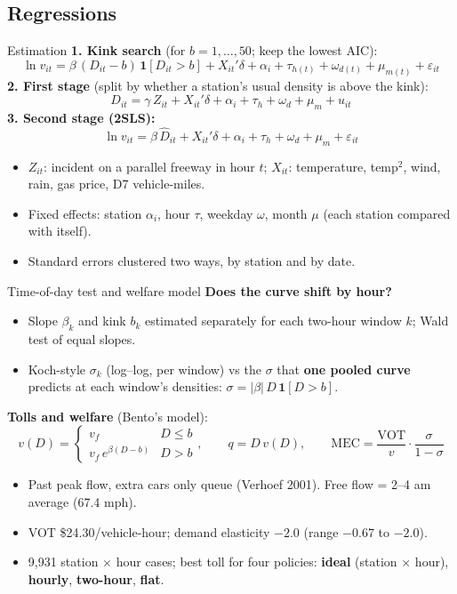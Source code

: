 \documentclass[compress]{beamer}
\newcommand{\hl}[1]{{\color{IITRBlue}\textbf{#1}}}
\begin{document}
\subsection{Regressions}
\begin{frame}[t]{Estimation}
\small
\textbf{1. Kink search} (for $b = 1,\dots,50$; keep the lowest AIC):
\[
\ln v_{it} = \beta\,(D_{it}-b)\,\mathbf{1}[D_{it}>b] + X_{it}'\delta + \alpha_i + \tau_{h(t)} + \omega_{d(t)} + \mu_{m(t)} + \varepsilon_{it}
\]
\textbf{2. First stage} (split by whether a station's usual density is above the kink):
\[
D_{it} = \gamma\, Z_{it} + X_{it}'\delta + \alpha_i + \tau_h + \omega_d + \mu_m + u_{it}
\]
\textbf{3. Second stage (2SLS):}
\[
\ln v_{it} = \beta\, \widehat{D}_{it} + X_{it}'\delta + \alpha_i + \tau_h + \omega_d + \mu_m + \varepsilon_{it}
\]
\begin{itemize}
\item $Z_{it}$: incident on a parallel freeway in hour $t$; $X_{it}$: temperature, temp$^2$, wind, rain, gas price, D7 vehicle-miles.
\item Fixed effects: station $\alpha_i$, hour $\tau$, weekday $\omega$, month $\mu$ (each station compared with itself).
\item Standard errors clustered two ways, by station and by date.
\end{itemize}
\end{frame}

\begin{frame}[t]{Time-of-day test and welfare model}
\footnotesize
\textbf{Does the curve shift by hour?}
\begin{itemize}
\item Slope $\beta_k$ and kink $b_k$ estimated separately for each two-hour window $k$; Wald test of equal slopes.
\item Koch-style $\sigma_k$ (log--log, per window) vs the $\sigma$ that \hl{one pooled curve} predicts at each window's densities: $\sigma = |\beta|\,D\,\mathbf{1}[D>b]$.
\end{itemize}
\textbf{Tolls and welfare} (Bento's model):
\[
v(D)=\begin{cases} v_f & D\le b\\ v_f\,e^{\beta(D-b)} & D>b\end{cases},\qquad q = D\,v(D),\qquad \text{MEC} = \frac{\text{VOT}}{v}\cdot\frac{\sigma}{1-\sigma}
\]
\begin{itemize}
\item Past peak flow, extra cars only queue (Verhoef 2001). Free flow = 2--4 am average (67.4 mph).
\item VOT \$24.30/vehicle-hour; demand elasticity $-2.0$ (range $-0.67$ to $-2.0$).
\item 9,931 station $\times$ hour cases; best toll for four policies: \hl{ideal} (station $\times$ hour), \hl{hourly}, \hl{two-hour}, \hl{flat}.
\end{itemize}
\end{frame}
\end{document}
